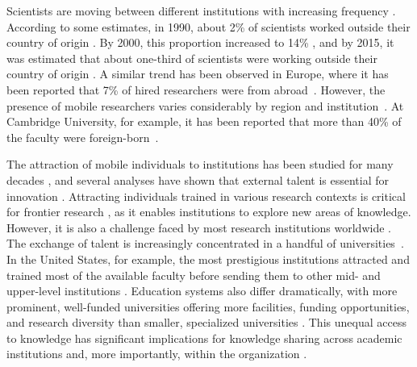 \documentclass[draft,final]{vutinfth} %
\begin{document}
Scientists are  moving between different institutions with increasing frequency \cite{sugimoto2017scientists}. According to some estimates, in 1990, about 2\% of scientists worked outside their country of origin \cite{stephan2001exceptional}. By 2000, this proportion increased to 14\% \cite{stephan2001exceptional}, and by 2015, it was estimated that about one-third of scientists were working outside their country of origin \cite{national2015revisiting}. A similar trend has been observed in Europe, where it has been reported that 7\% of hired researchers were from abroad~\cite{schiermeier2011career}. However, the presence of mobile researchers varies considerably by region and institution~\cite{machavcek2022researchers,schiermeier2011career, sugimoto2017scientists}. At Cambridge University, for example, it has been reported that more than 40\% of the faculty were foreign-born~\cite{schiermeier2011career}.  

The attraction of mobile individuals to institutions has been studied for many decades \cite{grant1996toward,stephan2001exceptional, ganguli2015immigration}, and several analyses have shown that external talent is essential for innovation \cite{cohen1990absorptive, stephan2001exceptional, stephan2012economics, sugimoto2017scientists, ganguli2015immigration}. Attracting individuals trained in various research contexts is critical for frontier research \cite{ganguli2015immigration,stephan2001exceptional, sugimoto2017scientists, lepori2015competition, franzoni2014mover, milojevic2018changing, jaffe1996flows}, as it enables institutions to explore new areas of knowledge. However, it is also a challenge faced by most research institutions worldwide \cite{lepori2015competition}. The exchange of talent  is increasingly concentrated in a handful of universities~\cite{stephan2012economics}. In the United States, for example, the most prestigious institutions attracted and trained most of the available faculty before sending them to other mid- and upper-level institutions \cite{clauset2015systematic,deville2014career}. Education systems also differ dramatically, with more prominent, well-funded universities offering more facilities, funding opportunities, and research diversity than smaller, specialized universities \cite{lepori2015competition,alvarez2021funding,costas2012approaching,lariviere2015team}. This unequal access to knowledge has significant implications for knowledge sharing across academic institutions and, more importantly, within the organization \cite{horn2007ranking,horta2009global}.
\end{document}
